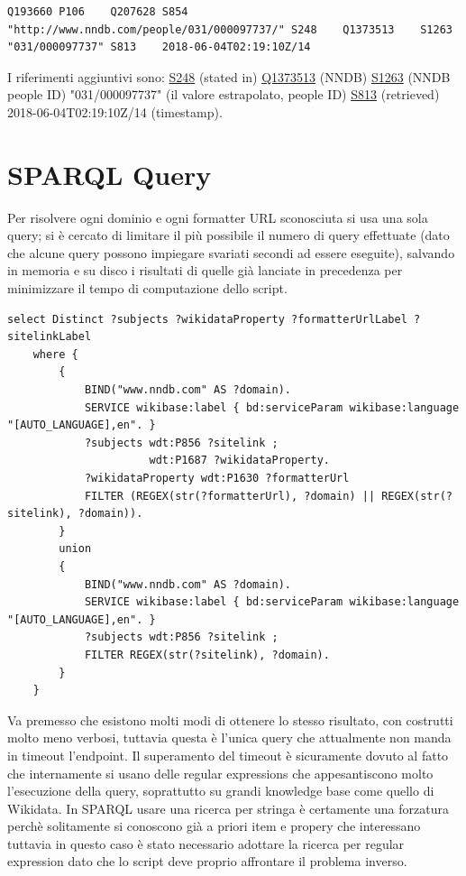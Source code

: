 \begin{lstlisting}[style=QuickstatementsStyle]
    Q193660	P106	Q207628	S854	"http://www.nndb.com/people/031/000097737/"	S248	Q1373513	S1263	"031/000097737"	S813	2018-06-04T02:19:10Z/14
\end{lstlisting}

I riferimenti aggiuntivi sono: 
\href{https://www.wikidata.org/wiki/Property:P248}{S248} (stated in)
\href{https://www.wikidata.org/wiki/Q1373513}{Q1373513} (NNDB)
\href{https://www.wikidata.org/wiki/Property:P1263}{S1263} (NNDB people ID)
"031/000097737" (il valore estrapolato, people ID)
\href{https://www.wikidata.org/wiki/Property:P813}{S813} (retrieved)
2018-06-04T02:19:10Z/14 (timestamp).

\section{SPARQL Query}
Per risolvere ogni dominio e ogni formatter URL sconosciuta si usa una sola query; si è cercato di limitare il più possibile il numero di query effettuate 
(dato che alcune query possono impiegare svariati secondi ad essere eseguite), 
salvando in memoria e su disco i risultati di quelle già lanciate in precedenza per minimizzare il tempo di computazione dello script.

\begin{lstlisting}[style=SPARQLStyle]
    select Distinct ?subjects ?wikidataProperty ?formatterUrlLabel ?sitelinkLabel
    where {
        {
            BIND("www.nndb.com" AS ?domain).
            SERVICE wikibase:label { bd:serviceParam wikibase:language "[AUTO_LANGUAGE],en". }
            ?subjects wdt:P856 ?sitelink ;
                      wdt:P1687 ?wikidataProperty.
            ?wikidataProperty wdt:P1630 ?formatterUrl
            FILTER (REGEX(str(?formatterUrl), ?domain) || REGEX(str(?sitelink), ?domain)).
        }
        union
        {
            BIND("www.nndb.com" AS ?domain).
            SERVICE wikibase:label { bd:serviceParam wikibase:language "[AUTO_LANGUAGE],en". }
            ?subjects wdt:P856 ?sitelink ;
            FILTER REGEX(str(?sitelink), ?domain).
        }
    }
\end{lstlisting}

Va premesso che esistono molti modi di ottenere lo stesso risultato, con costrutti molto meno verbosi, tuttavia questa è l'unica query che attualmente non manda in timeout l'endpoint.
Il superamento del timeout è sicuramente dovuto al fatto che internamente si usano delle regular expressions che appesantiscono molto l'esecuzione della query, soprattutto su 
grandi knowledge base come quello di Wikidata. 
In SPARQL usare una ricerca per stringa è certamente una forzatura perchè solitamente si conoscono già a priori item e propery che interessano tuttavia in questo caso è 
stato necessario adottare la ricerca per regular expression dato che lo script deve proprio affrontare il problema inverso.

